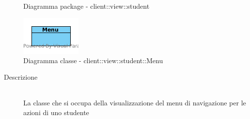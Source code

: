\begin{center}
\begin{figure}[H]
			\caption{Diagramma package - client::view::student}
		\end{figure}
	\end{center}\hypertarget{client::view::student::Menu}{}
\begin{center}
			\begin{figure}[H]
				\centering \includegraphics[scale=4, max width=\textwidth, max height=\myheight]{../img/diagrammiClassi/client/view/student/Menu.png}
				\caption{Diagramma classe - client::view::student::Menu}
			\end{figure}
		\end{center}\begin{description}
\item[Descrizione] \hfill \\
 La classe che si occupa della visualizzazione del menu di navigazione per le azioni di uno studente
\end{description}

